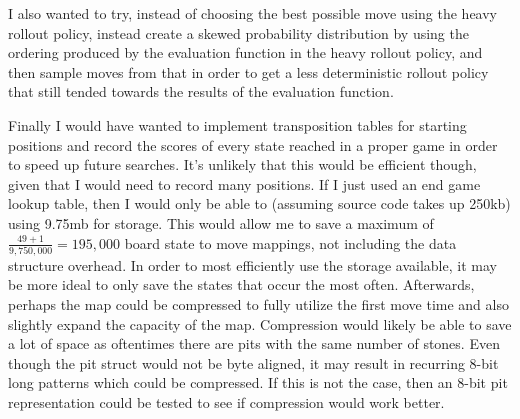 \documentclass{article}
\begin{document}
I also wanted to try, instead of choosing the best possible move using the heavy rollout policy, instead create a skewed probability distribution by using the ordering produced by the evaluation function
in the heavy rollout policy, and then sample moves from that in order to get a less deterministic rollout policy that still tended towards the results of the evaluation function.

Finally I would have wanted to implement transposition tables for starting positions and record the scores of every state reached in a proper game in order to speed up future
searches. It's unlikely that this would be efficient though, given that I would need to record many positions. If I just used an end game lookup table, then I would only be able to
(assuming source code takes up 250kb) using 9.75mb for storage. This would allow me to save a maximum of $ \frac{49 + 1}{9,750,000} = 195,000 $ board state to move mappings, not including
the data structure overhead. In order to most efficiently use the storage available, it may be more ideal to only save the states that occur the most often. Afterwards, perhaps the map could
be compressed to fully utilize the first move time and also slightly expand the capacity of the map. Compression would likely be able to save a lot of space as oftentimes there are pits
with the same number of stones. Even though the pit struct would not be byte aligned, it may result in recurring 8-bit long patterns which could be compressed. If this is not the case, then
an 8-bit pit representation could be tested to see if compression would work better.
\end{document}
